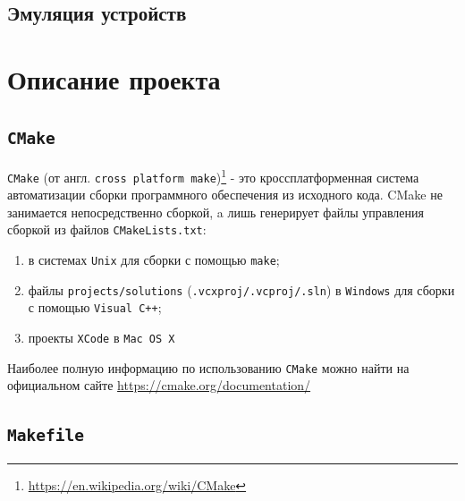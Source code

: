 \documentclass[12pt, twoside]{report}
\begin{document}
\section*{Эмуляция устройств}

\newpage
\chapter*{Описание проекта}

\section*{\texttt{CMake}}

\texttt{CMake} (от англ. \texttt{cross platform make})\footnote{\url{ https://en.wikipedia.org/wiki/CMake}} - это кроссплатформенная система автоматизации 
сборки программного обеспечения из исходного кода. CMake не занимается непосредственно сборкой, a лишь генерирует файлы управления 
сборкой из файлов \texttt{CMakeLists.txt}:
\begin{enumerate}
	\item {} в системах \texttt{Unix} для сборки с помощью \texttt{make};
	\item файлы \texttt{projects/solutions} (\texttt{.vcxproj/.vcproj/.sln}) в \texttt{Windows} для сборки с помощью \texttt{Visual C++};
	\item проекты \texttt{XCode} в \texttt{Mac OS X}
\end{enumerate}

Наиболее полную информацию по использованию \texttt{CMake} можно найти на официальном сайте \url{ https://cmake.org/documentation/}










\section*{\texttt{Makefile}}\label{Makefile}
\end{document}
